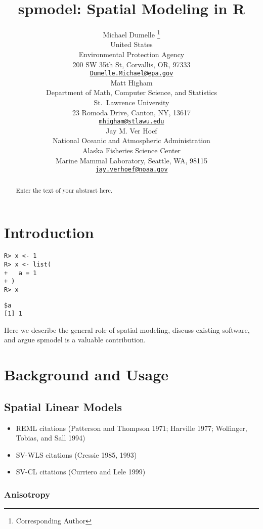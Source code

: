 \documentclass{article}
\title{spmodel: Spatial Modeling in \textbf{R}}
\author{
    Michael Dumelle
    \thanks{Corresponding Author}
   \\
    United States \\
    Environmental Protection Agency \\
  200 SW 35th St, Corvallis, OR, 97333 \\
  \texttt{\href{mailto:Dumelle.Michael@epa.gov}{\nolinkurl{Dumelle.Michael@epa.gov}}} \\
   \And
    Matt Higham
   \\
    Department of Math, Computer Science, and Statistics \\
    St.~Lawrence University \\
  23 Romoda Drive, Canton, NY, 13617 \\
  \texttt{\href{mailto:mhigham@stlawu.edu}{\nolinkurl{mhigham@stlawu.edu}}} \\
   \And
    Jay M. Ver Hoef
   \\
    National Oceanic and Atmospheric Administration \\
    Alaska Fisheries Science Center \\
  Marine Mammal Laboratory, Seattle, WA, 98115 \\
  \texttt{\href{mailto:jay.verhoef@noaa.gov}{\nolinkurl{jay.verhoef@noaa.gov}}} \\
  }
\providecommand{\tightlist}{%
  \setlength{\itemsep}{0pt}\setlength{\parskip}{0pt}}
\begin{document}
\maketitle


\begin{abstract}
Enter the text of your abstract here.
\end{abstract}


\hypertarget{introduction}{%
\section{\texorpdfstring{Introduction
\label{sec:introduction}}{Introduction }}\label{introduction}}

\begin{verbatim}
R> x <- 1
R> x <- list(
+   a = 1
+ )
R> x
\end{verbatim}

\begin{verbatim}
$a
[1] 1
\end{verbatim}

Here we describe the general role of spatial modeling, discuss existing
software, and argue spmodel is a valuable contribution.

\hypertarget{background-and-usage}{%
\section{Background and Usage}\label{background-and-usage}}

\hypertarget{spatial-linear-models}{%
\subsection{Spatial Linear Models}\label{spatial-linear-models}}

\begin{itemize}
\tightlist
\item
  REML citations (Patterson and Thompson 1971; Harville 1977; Wolfinger,
  Tobias, and Sall 1994)
\item
  SV-WLS citations (Cressie 1985, 1993)
\item
  SV-CL citations (Curriero and Lele 1999)
\end{itemize}

\hypertarget{anisotropy}{%
\subsubsection{Anisotropy}\label{anisotropy}}
\end{document}
